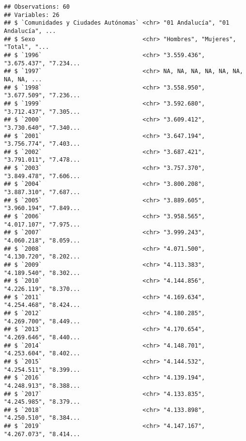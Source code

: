 \documentclass[
]{article}
\newenvironment{Shaded}{\begin{snugshade}}{\end{snugshade}}
\newcommand{\DecValTok}[1]{\textcolor[rgb]{0.00,0.00,0.81}{#1}}
\newcommand{\KeywordTok}[1]{\textcolor[rgb]{0.13,0.29,0.53}{\textbf{#1}}}
\newcommand{\NormalTok}[1]{#1}
\newcommand{\OperatorTok}[1]{\textcolor[rgb]{0.81,0.36,0.00}{\textbf{#1}}}
\newcommand{\StringTok}[1]{\textcolor[rgb]{0.31,0.60,0.02}{#1}}
\begin{document}
\begin{Shaded}
\end{Shaded}

\begin{verbatim}
## Observations: 60
## Variables: 26
## $ `Comunidades y Ciudades Autónomas` <chr> "01 Andalucía", "01 Andalucía", ...
## $ Sexo                               <chr> "Hombres", "Mujeres", "Total", "...
## $ `1996`                             <chr> "3.559.436", "3.675.437", "7.234...
## $ `1997`                             <chr> NA, NA, NA, NA, NA, NA, NA, NA, ...
## $ `1998`                             <chr> "3.558.950", "3.677.509", "7.236...
## $ `1999`                             <chr> "3.592.680", "3.712.437", "7.305...
## $ `2000`                             <chr> "3.609.412", "3.730.640", "7.340...
## $ `2001`                             <chr> "3.647.194", "3.756.774", "7.403...
## $ `2002`                             <chr> "3.687.421", "3.791.011", "7.478...
## $ `2003`                             <chr> "3.757.370", "3.849.478", "7.606...
## $ `2004`                             <chr> "3.800.208", "3.887.310", "7.687...
## $ `2005`                             <chr> "3.889.605", "3.960.194", "7.849...
## $ `2006`                             <chr> "3.958.565", "4.017.107", "7.975...
## $ `2007`                             <chr> "3.999.243", "4.060.218", "8.059...
## $ `2008`                             <chr> "4.071.500", "4.130.720", "8.202...
## $ `2009`                             <chr> "4.113.383", "4.189.540", "8.302...
## $ `2010`                             <chr> "4.144.856", "4.226.119", "8.370...
## $ `2011`                             <chr> "4.169.634", "4.254.468", "8.424...
## $ `2012`                             <chr> "4.180.285", "4.269.700", "8.449...
## $ `2013`                             <chr> "4.170.654", "4.269.646", "8.440...
## $ `2014`                             <chr> "4.148.701", "4.253.604", "8.402...
## $ `2015`                             <chr> "4.144.532", "4.254.511", "8.399...
## $ `2016`                             <chr> "4.139.194", "4.248.913", "8.388...
## $ `2017`                             <chr> "4.133.835", "4.245.985", "8.379...
## $ `2018`                             <chr> "4.133.898", "4.250.510", "8.384...
## $ `2019`                             <chr> "4.147.167", "4.267.073", "8.414...
\end{verbatim}
\end{document}
